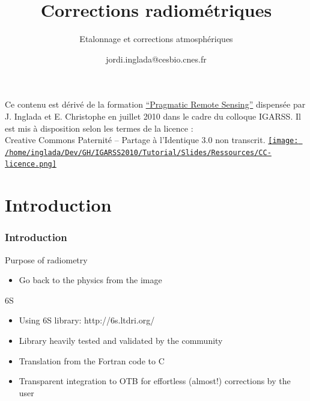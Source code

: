 \documentclass[compress]{beamer}
\title{Corrections radiométriques}
\subtitle{Etalonnage et corrections atmosphériques} %
\author
{jordi.inglada@cesbio.cnes.fr}
\institute[Cesbio] %
{\textsc{Centre d'Études Spatiales de la Biosphère, Toulouse, France}}
\date{}
\begin{document}
\begin{frame}
  \titlepage
  \begin{center}
{\tiny Ce contenu est dérivé de la formation \href{http://www.orfeo-toolbox.org/packages/PragmaticRemoteSensing-handout.pdf}{``Pragmatic Remote
  Sensing''} dispensée par J. Inglada et E. Christophe en juillet 2010
  dans le cadre du colloque IGARSS. Il est mis à disposition selon les termes de la licence :\\
Creative Commons Paternité – Partage à l’Identique 3.0 non transcrit.} \href{http://creativecommons.org/licenses/by-sa/3.0/}{\texttt{[image: /home/inglada/Dev/GH/IGARSS2010/Tutorial/Slides/Ressources/CC-licence.png]}}    
  \end{center}
\end{frame}

\section*{Introduction}

\begin{frame}

  \frametitle{Introduction}
  \begin{block}{Purpose of radiometry}
   \begin{itemize}
   \item Go back to the physics from the image
   \end{itemize}
  \end{block}
  \begin{block}{6S}
   \begin{itemize}
    \item Using 6S library: http://6s.ltdri.org/
    \item Library heavily tested and validated by the community
    \item Translation from the Fortran code to C
    \item Transparent integration to OTB for effortless (almost!) corrections by the user
   \end{itemize}
  \end{block}

\end{frame}
\end{document}
